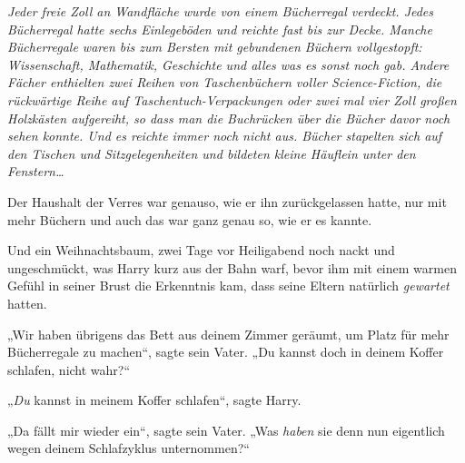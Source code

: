 \emph{Jeder freie Zoll an Wandfläche wurde von einem Bücherregal verdeckt. Jedes Bücherregal hatte sechs Einlegeböden und reichte fast bis zur Decke. Manche Bücherregale waren bis zum Bersten mit gebundenen Büchern vollgestopft: Wissenschaft, Mathematik, Geschichte und alles was es sonst noch gab. Andere Fächer enthielten zwei Reihen von Taschenbüchern voller Science-Fiction, die rückwärtige Reihe auf Taschentuch-Verpackungen oder zwei mal vier Zoll großen Holzkästen aufgereiht, so dass man die Buchrücken über die Bücher davor noch sehen konnte. Und es reichte immer noch nicht aus. Bücher stapelten sich auf den Tischen und Sitzgelegenheiten und bildeten kleine Häuflein unter den Fenstern…}

Der Haushalt der Verres war genauso, wie er ihn zurückgelassen hatte, nur mit mehr Büchern und auch das war ganz genau so, wie er es kannte.

Und ein Weihnachtsbaum, zwei Tage vor Heiligabend noch nackt und ungeschmückt, was Harry kurz aus der Bahn warf, bevor ihm mit einem warmen Gefühl in seiner Brust die Erkenntnis kam, dass seine Eltern natürlich \emph{gewartet} hatten.

„Wir haben übrigens das Bett aus deinem Zimmer geräumt, um Platz für mehr Bücherregale zu machen“, sagte sein Vater. „Du kannst doch in deinem Koffer schlafen, nicht wahr?“

„\emph{Du} kannst in meinem Koffer schlafen“, sagte Harry.

„Da fällt mir wieder ein“, sagte sein Vater. „Was \emph{haben} sie denn nun eigentlich wegen deinem Schlafzyklus unternommen?“

